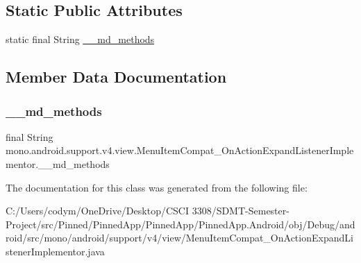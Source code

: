 \subsection*{Static Public Attributes}
\begin{DoxyCompactItemize}
\item 
static final String \hyperlink{classmono_1_1android_1_1support_1_1v4_1_1view_1_1_menu_item_compat___on_action_expand_listener_implementor_a784a531fa2fd045297a4b6c40ff359a1}{\+\_\+\+\_\+md\+\_\+methods}
\end{DoxyCompactItemize}


\subsection{Member Data Documentation}
\mbox{\label{classmono_1_1android_1_1support_1_1v4_1_1view_1_1_menu_item_compat___on_action_expand_listener_implementor_a784a531fa2fd045297a4b6c40ff359a1}} 
\subsubsection{\texorpdfstring{\+\_\+\+\_\+md\+\_\+methods}{\_\_md\_methods}}
{\footnotesize\ttfamily final String mono.\+android.\+support.\+v4.\+view.\+Menu\+Item\+Compat\+\_\+\+On\+Action\+Expand\+Listener\+Implementor.\+\_\+\+\_\+md\+\_\+methods\hspace{0.3cm}{\ttfamily [static]}}



The documentation for this class was generated from the following file\+:\begin{DoxyCompactItemize}
\item 
C\+:/\+Users/codym/\+One\+Drive/\+Desktop/\+C\+S\+C\+I 3308/\+S\+D\+M\+T-\/\+Semester-\/\+Project/src/\+Pinned/\+Pinned\+App/\+Pinned\+App/\+Pinned\+App.\+Android/obj/\+Debug/android/src/mono/android/support/v4/view/Menu\+Item\+Compat\+\_\+\+On\+Action\+Expand\+Listener\+Implementor.\+java\end{DoxyCompactItemize}
